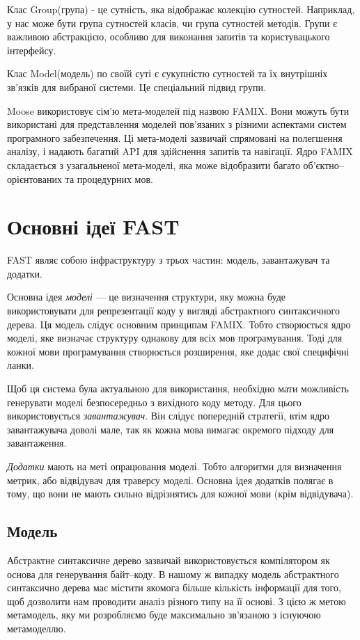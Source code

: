 \documentclass[12pt,a4paper]{article}
\begin{document}
Клас Group(група) - це сутність, яка відображає колекцію сутностей. Наприклад, у нас може бути група сутностей класів, чи група сутностей методів. Групи є важливою абстракцією, особливо для виконання запитів та користувацького інтерфейсу.

Клас Model(модель) по своїй суті є сукупністю сутностей та їх внутрішніх зв'язків для вибраної системи. Це спеціальний підвид групи.

Moose використовує сім'ю мета-моделей під назвою FAMIX. Вони можуть бути використані для представлення моделей пов'язаних з різними аспектами систем програмного забезпечення. Ці мета-моделі зазвичай спрямовані на полегшення аналізу,  і надають багатий API для здійснення запитів та навігації. Ядро FAMIX складається з узагальненої мета-моделі, яка може відобразити багато об'єктно--орієнтованих та процедурних мов. 

\clearpage

\section{Основні ідеї FAST}

FAST являє собою інфраструктуру з трьох частин: модель, завантажувач та додатки.

Основна ідея \emph{моделі} --- це визначення структури, яку можна буде використовувати для репрезентації коду у вигляді абстрактного синтаксичного дерева. Ця модель слідує основним принципам FAMIX. Тобто створюється ядро моделі, яке визначає структуру однакову для всіх мов програмування. Тоді для кожної мови програмування створюється розширення, яке додає свої специфічні ланки.

Щоб ця система була актуальною для використання, необхідно мати можливість генерувати моделі безпосередньо з вихідного коду методу. Для цього використовується \emph{завантажувач}. Він слідує попередній стратегії, втім ядро завантажувача доволі мале, так як кожна мова вимагає окремого підходу для завантаження.

\emph{Додатки} мають на меті опрацювання моделі. Тобто алгоритми для визначення метрик, або відвідувач для траверсу моделі. Основна ідея додатків полягає в тому, що вони не мають сильно відрізнятись для кожної мови (крім відвідувача).

\subsection{Модель}

Абстрактне синтаксичне дерево зазвичай використовується компілятором як основа для генерування байт--коду. В нашому ж випадку модель абстрактного синтаксично дерева має містити якомога більше кількість інформації для того, щоб дозволити нам проводити аналіз різного типу на її основі. З цією ж метою метамодель, яку ми розробляємо буде максимально зв'язаною з існуючою метамоделлю.
\end{document}
